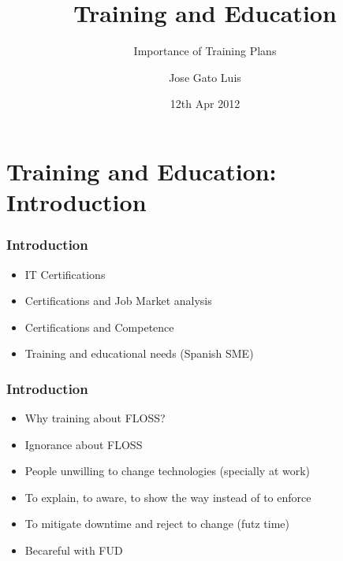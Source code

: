 \documentclass{beamer}
\begin{document}
\title{Training and Education}
\subtitle{Importance of Training Plans}
\author{Jose Gato Luis}
\date{12th Apr 2012}



\section{Training and Education: Introduction}

\begin{frame}
\frametitle{Introduction}
\begin{itemize}
\item IT Certifications
\item Certifications and Job Market analysis
\item Certifications and Competence
\item Training and educational needs (Spanish SME)
\end{itemize}
\end{frame}


\begin{frame}
\frametitle{Introduction}
\begin{itemize}
\item Why training about FLOSS?
\item Ignorance about FLOSS
\item People unwilling to change technologies (specially at work)
\item To explain, to aware, to show the way instead of to enforce
\item To mitigate downtime and reject to change (futz time)
\item Becareful with FUD
\end{itemize}
\end{frame}
\end{document}
